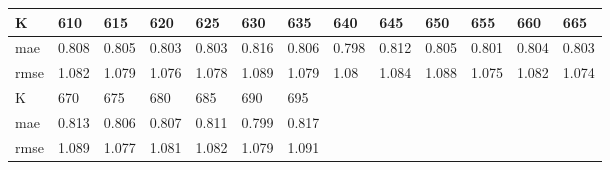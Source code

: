 \begin{appendices}
\begin{center}
\begin{tabularx}{\textwidth}{|l|X|X|X|X|X|X|X|X|X|X|X|X|}
		\hline 
		K & 610 & 615 & 620 & 625 & 630 & 635 & 640 & 645 & 650 & 655 & 660 & 665 \\ \hline 
		mae & 0.808 & 0.805 & 0.803 & 0.803 & 0.816 & 0.806 & 0.798 & 0.812 & 0.805 & 0.801 & 0.804 & 0.803 \\ \hline 
		rmse & 1.082 & 1.079 & 1.076 & 1.078 & 1.089 & 1.079 & 1.08 & 1.084 & 1.088 & 1.075 & 1.082 & 1.074 \\ \hline 
		\hline 
		K & 670 & 675 & 680 & 685 & 690 & 695  & & & & & & \\ \hline 
		mae & 0.813 & 0.806 & 0.807 & 0.811 & 0.799 & 0.817 & & & & & &  \\ \hline 
		rmse & 1.089 & 1.077 & 1.081 & 1.082 & 1.079 & 1.091  & & & & & & \\ \hline 
	\end{tabularx} 
\end{center}


\end{appendices}
